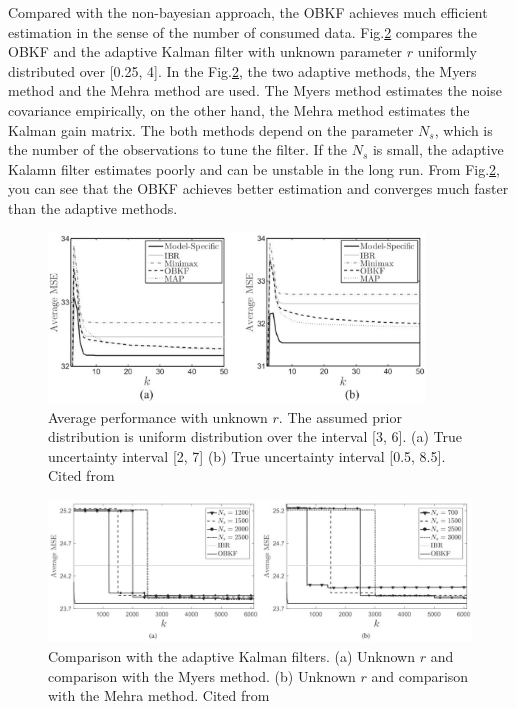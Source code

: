 Compared with the non-bayesian approach, the OBKF achieves much efficient estimation in the sense of the number of consumed data. Fig.\ref{fig:cmp_adaptive} compares the OBKF and the adaptive Kalman filter with unknown parameter $r$ uniformly distributed over [0.25, 4]. In the Fig.\ref{fig:cmp_adaptive}, the two adaptive methods, the Myers method\cite{Myers1976} and the Mehra method\cite{Mehra1972} are used. The Myers method estimates the noise covariance empirically, on the other hand, the Mehra method estimates the Kalman gain matrix. The both methods depend on the parameter $N_s$, which is the number of the observations to tune the filter. If the $N_s$ is small, the adaptive Kalamn filter estimates poorly and can be unstable in the long run. From Fig.\ref{fig:cmp_adaptive}, you can see that the OBKF achieves better estimation and converges much faster than the adaptive methods.

\begin{figure}[H]
    \begin{center}
    \includegraphics[width=10cm]{img/wrong_prior.eps}
    \caption{Average performance with unknown $r$. The assumed prior distribution is uniform distribution over the interval [3, 6]. (a) True uncertainty interval [2, 7] (b) True uncertainty interval [0.5, 8.5]. Cited from \cite{Dehghannasiri2018}}
    \label{fig:wrong_prior}
    \end{center}
\end{figure}

\begin{figure}[h]
    \begin{center}
    \includegraphics[width=15cm]{img/cmp_adaptive.eps}
    \caption{Comparison with the adaptive Kalman filters. (a) Unknown $r$ and comparison with the Myers method\cite{Myers1976}. (b) Unknown $r$ and comparison with the Mehra method\cite{Mehra1972}. Cited from \cite{Dehghannasiri2018}}
    \label{fig:cmp_adaptive}
    \end{center}
\end{figure}

